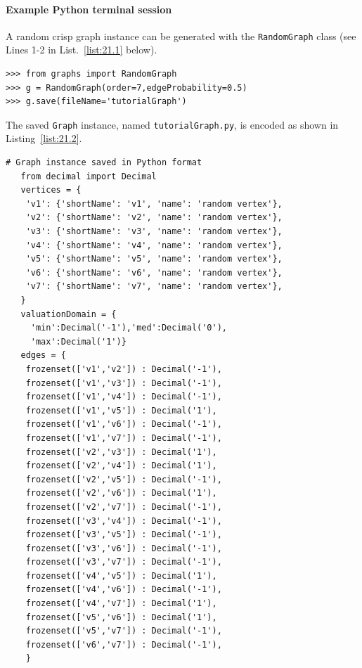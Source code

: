 \paragraph{\textbf{Example Python terminal session}}

\noindent A random crisp graph instance can be generated with the \texttt{RandomGraph} class (see Lines 1-2 in List.~\vref{list:21.1} below). 
\begin{lstlisting}[caption={Generating a randm graph instance},label=list:21.1]
>>> from graphs import RandomGraph
>>> g = RandomGraph(order=7,edgeProbability=0.5)
>>> g.save(fileName='tutorialGraph')
\end{lstlisting}

The saved \texttt{Graph} instance, named \texttt{tutorialGraph.py}, is encoded as shown in Listing~\vref{list:21.2}.
\begin{lstlisting}[caption={Stored instance of a random graph},label=list:21.2]
  # Graph instance saved in Python format
   from decimal import Decimal
   vertices = {
    'v1': {'shortName': 'v1', 'name': 'random vertex'},
    'v2': {'shortName': 'v2', 'name': 'random vertex'},
    'v3': {'shortName': 'v3', 'name': 'random vertex'},
    'v4': {'shortName': 'v4', 'name': 'random vertex'},
    'v5': {'shortName': 'v5', 'name': 'random vertex'},
    'v6': {'shortName': 'v6', 'name': 'random vertex'},
    'v7': {'shortName': 'v7', 'name': 'random vertex'},
   }
   valuationDomain = {
     'min':Decimal('-1'),'med':Decimal('0'),
     'max':Decimal('1')}
   edges = {
    frozenset(['v1','v2']) : Decimal('-1'), 
    frozenset(['v1','v3']) : Decimal('-1'), 
    frozenset(['v1','v4']) : Decimal('-1'), 
    frozenset(['v1','v5']) : Decimal('1'), 
    frozenset(['v1','v6']) : Decimal('-1'), 
    frozenset(['v1','v7']) : Decimal('-1'), 
    frozenset(['v2','v3']) : Decimal('1'), 
    frozenset(['v2','v4']) : Decimal('1'), 
    frozenset(['v2','v5']) : Decimal('-1'), 
    frozenset(['v2','v6']) : Decimal('1'), 
    frozenset(['v2','v7']) : Decimal('-1'), 
    frozenset(['v3','v4']) : Decimal('-1'), 
    frozenset(['v3','v5']) : Decimal('-1'), 
    frozenset(['v3','v6']) : Decimal('-1'), 
    frozenset(['v3','v7']) : Decimal('-1'), 
    frozenset(['v4','v5']) : Decimal('1'), 
    frozenset(['v4','v6']) : Decimal('-1'), 
    frozenset(['v4','v7']) : Decimal('1'), 
    frozenset(['v5','v6']) : Decimal('1'), 
    frozenset(['v5','v7']) : Decimal('-1'), 
    frozenset(['v6','v7']) : Decimal('-1'), 
    }
\end{lstlisting}

